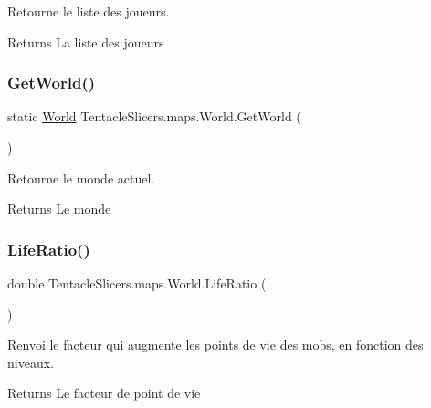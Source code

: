 Retourne le liste des joueurs. 

\begin{DoxyReturn}{Returns}
La liste des joueurs 
\end{DoxyReturn}
\mbox{\label{class_tentacle_slicers_1_1maps_1_1_world_afc92ddf0168726d7651893a2e0f5bc39}} 
\subsubsection{\texorpdfstring{Get\+World()}{GetWorld()}}
{\footnotesize\ttfamily static \hyperlink{class_tentacle_slicers_1_1maps_1_1_world}{World} Tentacle\+Slicers.\+maps.\+World.\+Get\+World (\begin{DoxyParamCaption}{ }\end{DoxyParamCaption})\hspace{0.3cm}{\ttfamily [static]}}



Retourne le monde actuel. 

\begin{DoxyReturn}{Returns}
Le monde 
\end{DoxyReturn}
\mbox{\label{class_tentacle_slicers_1_1maps_1_1_world_a1621a82ae5b10a2e8346458afab52ed8}} 
\subsubsection{\texorpdfstring{Life\+Ratio()}{LifeRatio()}}
{\footnotesize\ttfamily double Tentacle\+Slicers.\+maps.\+World.\+Life\+Ratio (\begin{DoxyParamCaption}{ }\end{DoxyParamCaption})}



Renvoi le facteur qui augmente les points de vie des mobs, en fonction des niveaux. 

\begin{DoxyReturn}{Returns}
Le facteur de point de vie 
\end{DoxyReturn}
\mbox{\label{class_tentacle_slicers_1_1maps_1_1_world_a04ef69bcd3d1eb1e0aed79a61a481bf4}} 

